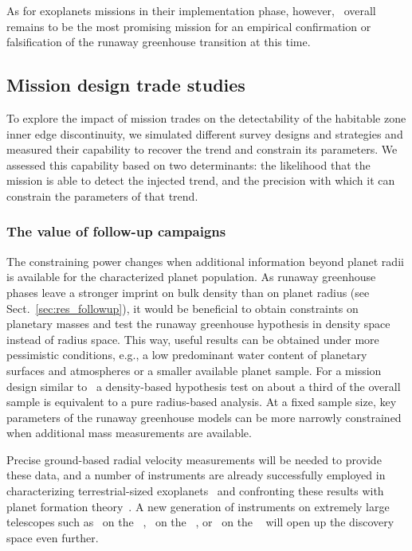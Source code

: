 \documentclass[twocolumn,twocolappendix,linenumbers]{aastex631}
\begin{document}
As for exoplanets missions in their implementation phase, however, \plato\ overall remains to be the most promising mission for an empirical confirmation or falsification of the runaway greenhouse transition at this time.


\subsection{Mission design trade studies}\label{sec:mission-design-trades}
To explore the impact of mission trades on the detectability of the habitable zone inner edge discontinuity, we simulated different survey designs and strategies and measured their capability to recover the trend and constrain its parameters.
We assessed this capability based on two determinants: the likelihood that the mission is able to detect the injected trend, and the precision with which it can constrain the parameters of that trend.

\subsubsection{The value of follow-up campaigns}
The constraining power changes when additional information beyond planet radii is available for the characterized planet population.
As runaway greenhouse phases leave a stronger imprint on bulk density than on planet radius (see Sect.~\ref{sec:res_followup}), it would be beneficial to obtain constraints on planetary masses and test the runaway greenhouse hypothesis in density space instead of radius space.
This way, useful results can be obtained under more pessimistic conditions, e.g., a low predominant water content of planetary surfaces and atmospheres or a smaller available planet sample.
For a mission design similar to \plato\, a density-based hypothesis test on about a third of the overall sample is equivalent to a pure radius-based analysis.
At a fixed sample size, key parameters of the runaway greenhouse models can be more narrowly constrained when additional mass measurements are available.

Precise ground-based radial velocity measurements will be needed to provide these data, and a number of instruments are already successfully employed in characterizing terrestrial-sized exoplanets~\citep[e.g.,][]{Queloz2001a,Pepe2010,Johnson2010b,Ribas2023} and confronting these results with planet formation theory~\citep[e.g.,][]{Miguel2020a,Burn2021,Zawadzki2021a,Schlecker2022}.
A new generation of instruments on extremely large telescopes such as \gclef\ on the \gmt ~\citep{Szentgyorgyi2016}, \andes\ on the \elt ~\citep{Marcantonio2022}, or \modhis\ on the \tmt ~\citep{Mawet2019} will open up the discovery space even further.
\end{document}
